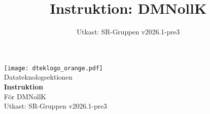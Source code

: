 \documentclass[a4paper]{dtek}
\title{Instruktion: DMNollK}
\date{Utkast: SR-Gruppen v2026.1-pre3}
\begin{document}
\begin{titlepage}
  \thispagestyle{empty} %
  \vspace*{\fill}
  \begin{center}
    \texttt{[image: dteklogo\_orange.pdf]}\\[3em]
    {\Huge Datateknologsektionen}\\[3em]
    {\Huge \textbf{Instruktion}}\\[1em]
    {\Huge För DMNollK}\\[3em]
    Utkast: SR-Gruppen v2026.1-pre3\\[20em]
  \end{center}
  \vspace*{\fill}
\end{titlepage}

\makeheadfoot

\setcounter{tocdepth}{2}
\tableofcontents
\end{document}

